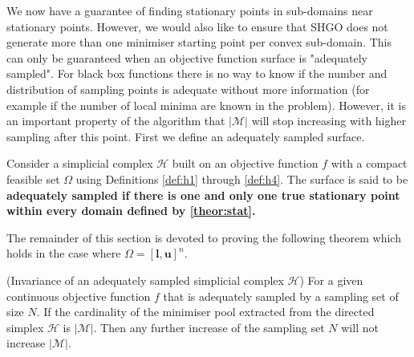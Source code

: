 We now have a guarantee of finding stationary points in sub-domains near stationary points. However, we would also like to ensure that SHGO does not generate more than one minimiser starting point per convex sub-domain. This can only be guaranteed when an objective function surface is "adequately sampled". For black box functions there is no way to know if the number and distribution of sampling points is adequate without more information (for example if the number of local minima are known in the problem). However, it is an important property of the algorithm that $|\mathcal{M}|$ will stop increasing with higher sampling after this point. First we define an adequately sampled surface.

\begin{definition}
Consider a simplicial complex $\mathcal{H}$ built on an objective function $f$ with a compact feasible set $\Omega$ using Definitions \ref{def:h1} through \ref{def:h4}. The surface is said to be \bf{adequately sampled} \normalfont if there is one and only one true stationary point within every domain defined by \autoref{theor:stat}.
\end{definition}

The remainder of this section is devoted to proving the following theorem which holds in the case where $\Omega = [\mathbf{l}, \mathbf{u}]^n$.

\begin{theorem} \label{theorem:invariance_M} (Invariance of an adequately sampled simplicial complex $\mathcal{H}$) For a given continuous objective function $f$ that is adequately sampled by a sampling set of size $N$. If the cardinality of the minimiser pool extracted from the directed simplex $\mathcal{H}$ is $|\mathcal{M}|$. Then any further increase of the sampling set $N$ will not increase $|\mathcal{M}|$.
\end{theorem}

